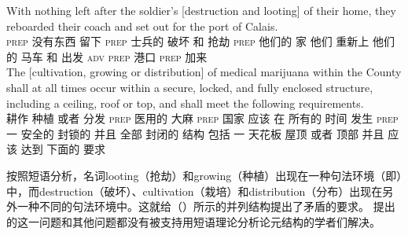 \addlines[2]
\eal
\ex 
\gll With nothing left after the soldier's [destruction and looting] of their home, they reboarded their coach and set out for the port of Calais.\\
    \textsc{prep} 没有东西 留下 \textsc{prep}  士兵的 \spacebr{}破坏 和 抢劫 \textsc{prep} 他们的 家 他们 重新上 他们的 马车 和 出发 \textsc{adv} \textsc{prep}  港口 \textsc{prep} 加来\\
\ex  
\gll The [cultivation, growing or distribution] of medical marijuana within the County shall at all times occur within a secure, locked, and fully enclosed structure, including a ceiling, roof or top, and shall meet the following requirements.\\
      耕作 种植 或者 分发 \textsc{prep} 医用的 大麻 \textsc{prep}  国家 应该 在 所有的 时间 发生 \textsc{prep} 一 安全的 封锁的 并且 全部 封闭的 结构 包括 一 天花板 屋顶 或者 顶部 并且 应该 达到  下面的 要求\\
\zl

    按照短语分析，名词looting（抢劫）和growing（种植）出现在一种句法环境（即\vPc ）中，而destruction（破坏）、cultivation（栽培）和distribution（分布）出现在另外一种不同的句法环境中。这就给（）所示的并列结构提出了矛盾的要求。 \citet{Wechsler2008a}提出的这一问题和其他问题都没有被支持用短语理论分析论元结构的学者们解决。


